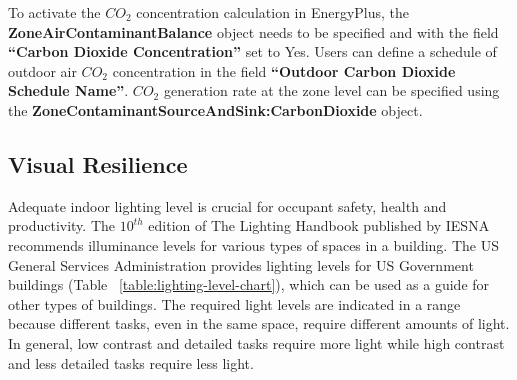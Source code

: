 To activate the $CO_2$ concentration calculation in EnergyPlus, the
\textbf{ZoneAirContaminantBalance} object needs to be specified and with the
field \textbf{``Carbon Dioxide Concentration''} set to Yes. Users can define a
schedule of outdoor air $CO_2$ concentration in the field \textbf{``Outdoor
Carbon Dioxide Schedule Name''}. $CO_2$ generation rate at the zone level can be
specified using the \textbf{ZoneContaminantSourceAndSink:CarbonDioxide} object.

\subsection{Visual Resilience}\label{visual-resilience}

Adequate indoor lighting level is crucial for occupant safety, health and
productivity. The $10^{th}$ edition of The Lighting Handbook published by IESNA
recommends illuminance levels for various types of spaces in a building. The US
General Services Administration provides lighting levels for US Government
buildings (Table ~\ref{table:lighting-level-chart}), which can be used as a
guide for other types of buildings. The required light levels are indicated in a
range because different tasks, even in the same space, require different amounts
of light. In general, low contrast and detailed tasks require more light while
high contrast and less detailed tasks require less light.

